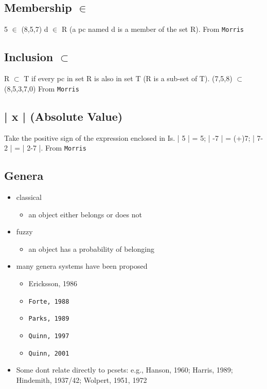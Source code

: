 \documentclass[11pt]{article}
\begin{document}
{{\subsection{Membership $\in$}
\label{sec-21-12}
5 $\in$ (8,5,7) d $\in$ R (a pc named d is a member of the set R).  From
\texttt{Morris}

\subsection{Inclusion $\subset$}
\label{sec-21-13}
R $\subset$ T if every pc in set R is also in set T (R is a sub-set of
T).  (7,5,8) $\subset$ (8,5,3,7,0) From \texttt{Morris}

\subsection{| x | (Absolute Value)}
\label{sec-21-14}
Take the positive sign of the expression enclosed in Is. | 5 | = 5; |
-7 | = (+)7; | 7-2 | = | 2-7 |.  From \texttt{Morris}

\subsection{Genera}
\label{sec-21-15}
\begin{itemize}
\item classical
\begin{itemize}
\item an object either belongs or does not
\end{itemize}
\item fuzzy
\begin{itemize}
\item an object has a probability of belonging
\end{itemize}
\item many genera systems have been proposed
\begin{itemize}
\item Ericksson, 1986
\item \texttt{Forte, 1988}
\item \texttt{Parks, 1989}
\item \texttt{Quinn, 1997}
\item \texttt{Quinn, 2001}
\end{itemize}
\item Some dont relate directly to pcsets: e.g., Hanson, 1960; Harris,
1989; Hindemith, 1937/42; Wolpert, 1951, 1972
\end{itemize}

}}
\end{document}
